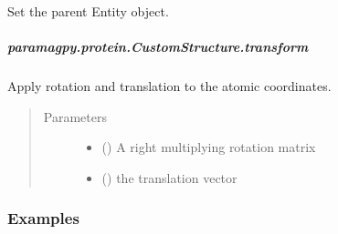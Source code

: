 \documentclass[a4paper,10pt,english,openany,oneside]{sphinxmanual}
\begin{document}
\begin{fulllineitems}
\begin{fulllineitems}
\begin{fulllineitems}
\label{\detokenize{reference/generated/paramagpy.protein.CustomStructure.set_parent:paramagpy.protein.CustomStructure.set_parent}}
Set the parent Entity object.

\end{fulllineitems}



\subparagraph{paramagpy.protein.CustomStructure.transform}
\label{\detokenize{reference/generated/paramagpy.protein.CustomStructure.transform:paramagpy-protein-customstructure-transform}}\label{\detokenize{reference/generated/paramagpy.protein.CustomStructure.transform::doc}}

\begin{fulllineitems}
\label{\detokenize{reference/generated/paramagpy.protein.CustomStructure.transform:paramagpy.protein.CustomStructure.transform}}
Apply rotation and translation to the atomic coordinates.
\begin{quote}\begin{description}
\item[{Parameters}] \leavevmode\begin{itemize}
\item {} 
 () \textendash{} A right multiplying rotation matrix

\item {} 
 () \textendash{} the translation vector

\end{itemize}

\end{description}\end{quote}
\subsubsection*{Examples}


\end{fulllineitems}
\end{fulllineitems}
\end{fulllineitems}
\end{document}
